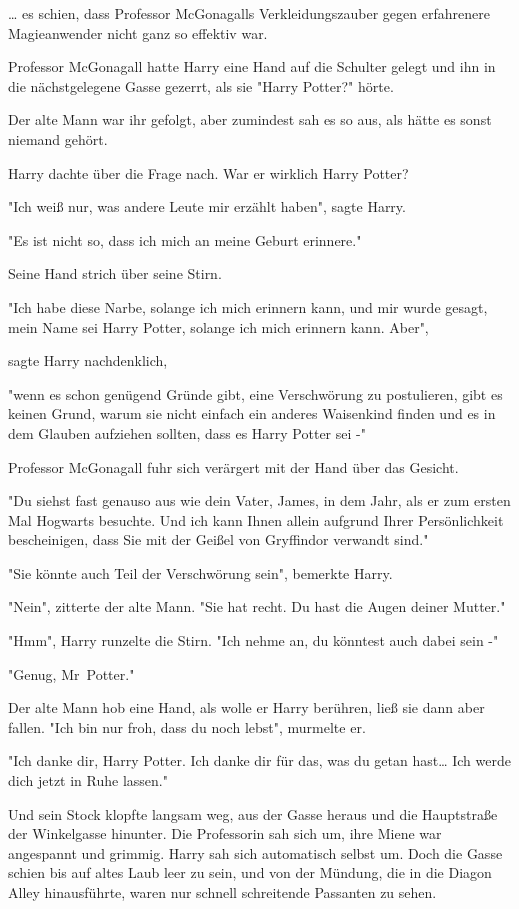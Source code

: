 {… es schien, dass Professor McGonagalls Verkleidungszauber gegen erfahrenere Magieanwender nicht ganz so effektiv war.

Professor McGonagall hatte Harry eine Hand auf die Schulter gelegt und ihn in die nächstgelegene Gasse gezerrt, als sie "Harry Potter?" hörte.

Der alte Mann war ihr gefolgt, aber zumindest sah es so aus, als hätte es sonst niemand gehört.

Harry dachte über die Frage nach. War er wirklich Harry Potter?

"Ich weiß nur, was andere Leute mir erzählt haben", sagte Harry.

"Es ist nicht so, dass ich mich an meine Geburt erinnere."

Seine Hand strich über seine Stirn.

"Ich habe diese Narbe, solange ich mich erinnern kann, und mir wurde gesagt, mein Name sei Harry Potter, solange ich mich erinnern kann. Aber",

sagte Harry nachdenklich,

"wenn es schon genügend Gründe gibt, eine Verschwörung zu postulieren, gibt es keinen Grund, warum sie nicht einfach ein anderes Waisenkind finden und es in dem Glauben aufziehen sollten, dass es Harry Potter sei -"

Professor McGonagall fuhr sich verärgert mit der Hand über das Gesicht.

"Du siehst fast genauso aus wie dein Vater, James, in dem Jahr, als er zum ersten Mal Hogwarts besuchte. Und ich kann Ihnen allein aufgrund Ihrer Persönlichkeit bescheinigen, dass Sie mit der Geißel von Gryffindor verwandt sind."

"Sie könnte auch Teil der Verschwörung sein", bemerkte Harry.

"Nein", zitterte der alte Mann. "Sie hat recht. Du hast die Augen deiner Mutter."

"Hmm", Harry runzelte die Stirn. "Ich nehme an, du könntest auch dabei sein -"

"Genug, Mr~Potter."

Der alte Mann hob eine Hand, als wolle er Harry berühren, ließ sie dann aber fallen. "Ich bin nur froh, dass du noch lebst", murmelte er.

"Ich danke dir, Harry Potter. Ich danke dir für das, was du getan hast… Ich werde dich jetzt in Ruhe lassen."

Und sein Stock klopfte langsam weg, aus der Gasse heraus und die Hauptstraße der Winkelgasse hinunter. Die Professorin sah sich um, ihre Miene war angespannt und grimmig. Harry sah sich automatisch selbst um. Doch die Gasse schien bis auf altes Laub leer zu sein, und von der Mündung, die in die Diagon Alley hinausführte, waren nur schnell schreitende Passanten zu sehen.

}
